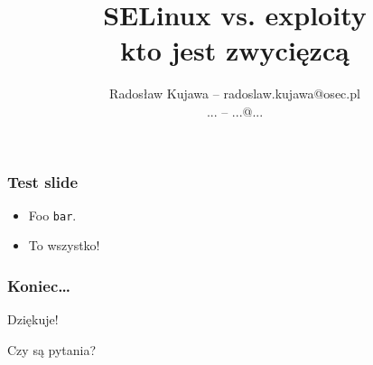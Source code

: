 \documentclass[dvipsnames,table]{beamer}
\title{SELinux vs. exploity\\ kto jest zwycięzcą}
\author{Radosław Kujawa -- radoslaw.kujawa@osec.pl \\ ... -- ...@...}
\begin{document}
\begin{frame}
	\titlepage
\end{frame}

\begin{frame}
\frametitle{Test slide}
\begin{itemize}
	\item Foo {\tt bar}.
	\item To wszystko! \Smiley
\end{itemize}
\end{frame}

\begin{frame}
\frametitle{Koniec\ldots}
\begin{center}

Dziękuje!

Czy są pytania?

\end{center}
\end{frame}
\end{document}
